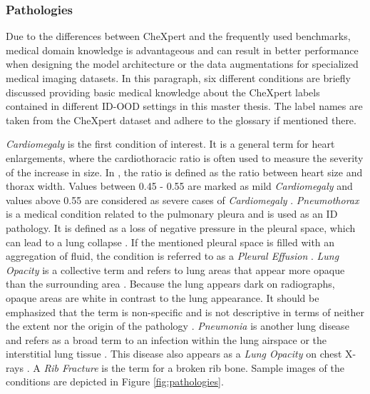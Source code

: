 \subsubsection{Pathologies}
Due to the differences between CheXpert and the frequently used benchmarks, medical domain knowledge is advantageous and can result in better performance when designing the model architecture or the data augmentations for specialized medical imaging datasets.
In this paragraph, six different conditions are briefly discussed providing basic medical knowledge about the CheXpert labels contained in different ID-OOD settings in this master thesis.
The label names are taken from the CheXpert dataset \citep{Irvin2019} and adhere to the glossary \citep{Hansell2008} if mentioned there.
\par
\textit{Cardiomegaly} is the first condition of interest.
It is a general term for heart enlargements, where the cardiothoracic ratio is often used to measure the severity of the increase in size.
In \citep{Dahnert2011}, the ratio is defined as the ratio between heart size and thorax width. 
Values between 0.45 - 0.55 are marked as mild \textit{Cardiomegaly} and values above 0.55 are considered as severe cases of \textit{Cardiomegaly} \citep{Dahnert2011}.
\textit{Pneumothorax} is a medical condition related to the pulmonary pleura and is used as an ID pathology.
It is defined as a loss of negative pressure in the pleural space, which can lead to a lung collapse \citep{Dahnert2011, Hansell2008}.
If the mentioned pleural space is filled with an aggregation of fluid, the condition is referred to as a \textit{Pleural Effusion} \citep{Karkhanis2012}.
\textit{Lung Opacity} is a collective term and refers to lung areas that appear more opaque than the surrounding area \citep{Hansell2008}.
Because the lung appears dark on radiographs, opaque areas are white in contrast to the lung appearance.
It should be emphasized that the term is non-specific and is not descriptive in terms of neither the extent nor the origin of the pathology \citep{Hansell2008}.
\textit{Pneumonia} is another lung disease and refers as a broad term to an infection within the lung airspace or the interstitial lung tissue \citep{Hansell2008}.
This disease also appears as a \textit{Lung Opacity} on chest X-rays \citep{Hansell2008}.
A \textit{Rib Fracture} is the term for a broken rib bone.
Sample images of the conditions are depicted in Figure \ref{fig:pathologies}.

